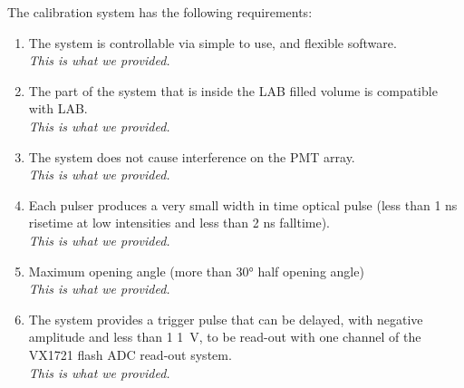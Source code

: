 

The calibration system has the following requirements:

\begin{enumerate}
\item The system is controllable via simple to use, and flexible software.\\ 
\emph{This is what we provided.} 
\item The part of the system that is inside the LAB filled volume is compatible with LAB.\\ 
\emph{This is what we provided.} 
\item The system does not cause interference on the PMT array.\\ 
\emph{This is what we provided.} 
\item Each pulser produces a very small width in time optical pulse (less than 1 ns risetime at low intensities and less than 2 ns falltime).\\ 
\emph{This is what we provided.} 
\item Maximum opening angle (more than \ang{30} half opening angle)\\ 
\emph{This is what we provided.} 
\item The system provides a trigger pulse that can be delayed, with negative amplitude and less than 1 1~V, to be read-out with one channel of the VX1721 flash ADC read-out system.\\ 
\emph{This is what we provided.}
\end{enumerate}
